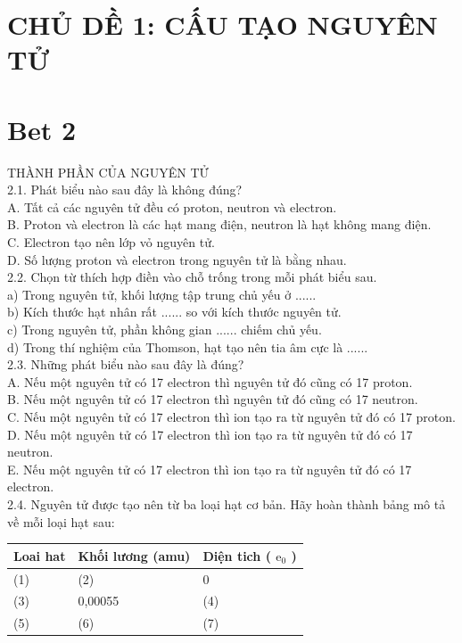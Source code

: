 \documentclass[10pt]{article}
\begin{document}
\section*{CHỦ DỀ 1: CẤU TẠO NGUYÊN TỬ}
\section*{Bet 2}
THÀNH PHẦN CỦA NGUYÊN TỬ\\
2.1. Phát biểu nào sau đây là không đúng?\\
A. Tất cả các nguyên tử đều có proton, neutron và electron.\\
B. Proton và electron là các hạt mang điện, neutron là hạt không mang điện.\\
C. Electron tạo nên lớp vỏ nguyên tử.\\
D. Số lượng proton và electron trong nguyên tử là bằng nhau.\\
2.2. Chọn từ thích hợp điền vào chỗ trống trong mỗi phát biểu sau.\\
a) Trong nguyên tử, khối lượng tập trung chủ yếu ở ......\\
b) Kích thước hạt nhân rất ...... so với kích thước nguyên tử.\\
c) Trong nguyên tử, phần không gian ...... chiếm chủ yếu.\\
d) Trong thí nghiệm của Thomson, hạt tạo nên tia âm cực là ......\\
2.3. Những phát biểu nào sau đây là đúng?\\
A. Nếu một nguyên tử có 17 electron thì nguyên tử đó cũng có 17 proton.\\
B. Nếu một nguyên tử có 17 electron thì nguyên tử đó cũng có 17 neutron.\\
C. Nếu một nguyên tử có 17 electron thì ion tạo ra từ nguyên tử đó có 17 proton.\\
D. Nếu một nguyên tử có 17 electron thì ion tạo ra từ nguyên tử đó có 17 neutron.\\
E. Nếu một nguyên tử có 17 electron thì ion tạo ra từ nguyên tử đó có 17 electron.\\
2.4. Nguyên tử được tạo nên từ ba loại hạt cơ bản. Hãy hoàn thành bảng mô tả về mỗi loại hạt sau:

\begin{center}
\begin{tabular}{|l|l|l|}
\hline
Loai hat & Khối lương (amu) & Diện tich ( $\mathrm{e}_{0}$ ) \\
\hline
(1) & (2) & 0 \\
\hline
(3) & 0,00055 & (4) \\
\hline
(5) & (6) & (7) \\
\hline
\end{tabular}
\end{center}
\end{document}
